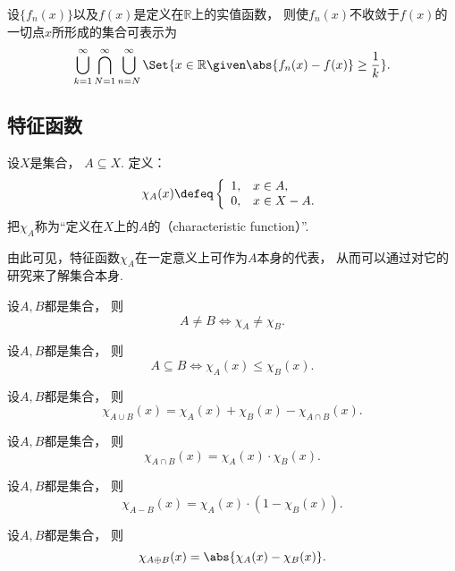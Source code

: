 \begin{proposition}
设\(\{f_n(x)\}\)以及\(f(x)\)是定义在\(\mathbb{R}\)上的实值函数，
则使\(f_n(x)\)不收敛于\(f(x)\)的一切点\(x\)所形成的集合可表示为\[
	\bigcup_{k=1}^\infty
	\bigcap_{N=1}^\infty
	\bigcup_{n=N}^\infty
	\Set{
		x\in\mathbb{R}
		\given
		\abs{f_n(x) - f(x)} \geq \frac1k
	}.
\]
\end{proposition}

\subsection{特征函数}
\begin{definition}
设\(X\)是集合，
\(A \subseteq X\).
定义：\[
	\chi_A(x)
	\defeq
	\left\{ \begin{array}{cl}
		1, & x \in A, \\
		0, & x \in X - A.
	\end{array} \right.
\]
把\(\chi_A\)称为“定义在\(X\)上的\(A\)的（characteristic function）”.
\end{definition}
由此可见，特征函数\(\chi_A\)在一定意义上可作为\(A\)本身的代表，
从而可以通过对它的研究来了解集合本身.

\begin{proposition}
设\(A,B\)都是集合，
则\[
	A \neq B \iff \chi_A \neq \chi_B.
\]
\end{proposition}

\begin{proposition}
设\(A,B\)都是集合，
则\[
	A \subseteq B
	\iff
	\chi_A(x) \leq \chi_B(x).
\]
\end{proposition}

\begin{proposition}
设\(A,B\)都是集合，
则\[
	\chi_{A \cup B}(x)
	= \chi_A(x) + \chi_B(x) - \chi_{A \cap B}(x).
\]
\end{proposition}

\begin{proposition}
设\(A,B\)都是集合，
则\[
	\chi_{A \cap B}(x)
	= \chi_A(x) \cdot \chi_B(x).
\]
\end{proposition}

\begin{proposition}
设\(A,B\)都是集合，
则\[
	\chi_{A - B}(x)
	= \chi_A(x) \cdot (1 - \chi_B(x)).
\]
\end{proposition}

\begin{proposition}
设\(A,B\)都是集合，
则\[
	\chi_{A \oplus B}(x)
	= \abs{\chi_A(x) - \chi_B(x)}.
\]
\end{proposition}

